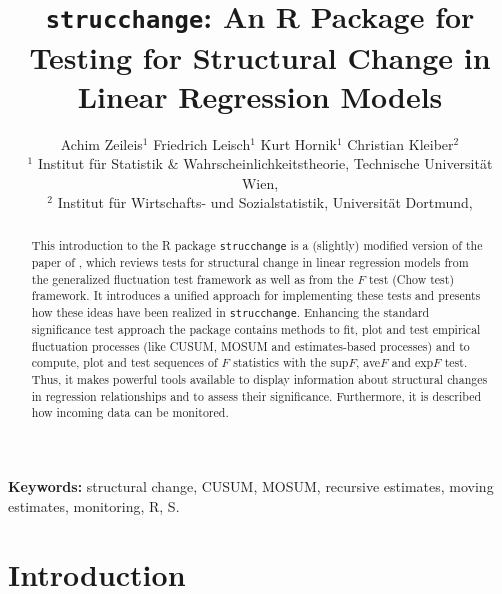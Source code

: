 \documentclass[10pt,a4paper]{article}
\begin{document}

\title{\texttt{strucchange}: An \textsf{R}  Package for Testing for Structural
Change in Linear Regression Models}
\author{Achim Zeileis$^1$ \hspace{0.4cm} Friedrich Leisch$^1$ \hspace{0.4cm} Kurt Hornik$^1$ \hspace{0.4cm} Christian Kleiber$^2$\\
{\small $^1$ Institut f\"ur Statistik \& Wahrscheinlichkeitstheorie, Technische Universit\"at Wien,}\\
{\small $^2$ Institut f\"ur Wirtschafts- und Sozialstatistik, Universit\"at
Dortmund,}}
\date{}
\maketitle

\begin{abstract}
This introduction to the \textsf{R} package \texttt{strucchange} is a (slightly)
modified version of the paper of
\cite{sc:Zeileis+Leisch+Hornik:2002}, which
reviews tests for structural change in linear regression models from
the generalized fluctuation test framework as well as from the $F$ test (Chow
test) framework. It introduces a unified approach for implementing these tests
and presents how these ideas have been realized in {\tt strucchange}.
Enhancing the standard significance test approach the package contains
methods to fit, plot and test empirical fluctuation processes (like CUSUM, MOSUM
and estimates-based processes) and to compute, plot and test
sequences of $F$ statistics with the sup$F$, ave$F$ and exp$F$ test.
Thus, it makes powerful tools available to display information about
structural changes in regression relationships and to assess their significance.
Furthermore, it is described how incoming data can be monitored.
\end{abstract}

\noindent
{\bf Keywords:} structural change, CUSUM, MOSUM, recursive estimates, moving
estimates, monitoring, \textsf{R}, \textsf{S}.\\

\section{Introduction} \label{sec:intro}
\end{document}
